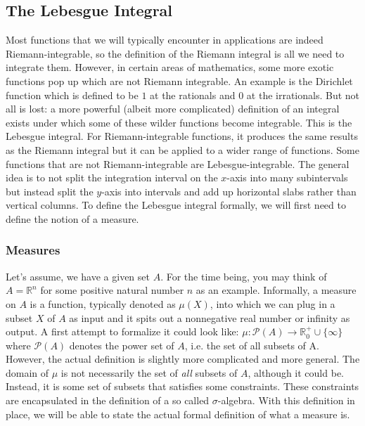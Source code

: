 \subsection{The Lebesgue Integral} 
Most functions that we will typically encounter in applications are indeed Riemann-integrable, so the definition of the Riemann integral is all we need to integrate them. However, in certain areas of mathematics, some more exotic functions pop up which are not Riemann integrable. An example is the Dirichlet function which is defined to be $1$ at the rationals and $0$ at the irrationals. But not all is lost: a more powerful (albeit more complicated) definition of an integral exists under which some of these wilder functions become integrable. This is the Lebesgue integral. For Riemann-integrable functions, it produces the same results as the Riemann integral but it can be applied to a wider range of functions. Some functions that are not Riemann-integrable are Lebesgue-integrable. The general idea is to not split the integration interval on the $x$-axis into many subintervals but instead split the $y$-axis into intervals and add up horizontal slabs rather than vertical columns. To define the Lebesgue integral formally, we will first need to define the notion of a measure.


\subsubsection{Measures}
Let's assume, we have a given set $A$. For the time being, you may think of $A = \mathbb{R}^n$ for some positive natural number $n$ as an example. Informally, a measure on $A$ is a function, typically denoted as $\mu(X)$, into which we can plug in a subset $X$ of $A$ as input and it spits out a nonnegative real number or infinity as output. A first attempt to formalize it could look like: $\mu: \mathcal{P}(A) \rightarrow \mathbb{R}^+_0 \cup \{  \infty \}$ where $\mathcal{P}(A)$ denotes the power set of $A$, i.e. the set of all subsets of A. However, the actual definition is slightly more complicated and more general. The domain of $\mu$ is not necessarily the set of \emph{all} subsets of $A$, although it could be. Instead, it is some set of subsets that satisfies some constraints. These constraints are encapsulated in the definition of a so called $\sigma$-algebra. With this definition in place, we will be able to state the actual formal definition of what a measure is.


